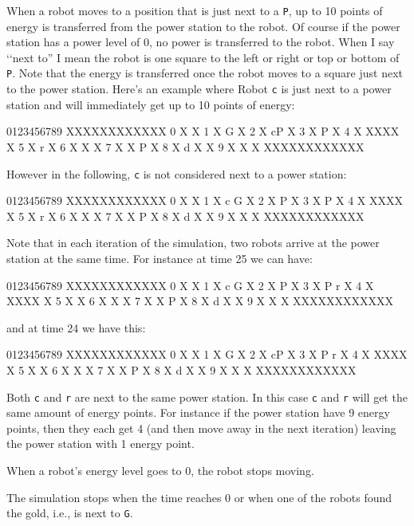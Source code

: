 When a robot moves to a position that is just next to a \verb!P!,
up to 10 points of energy is transferred from the power station to the robot.
Of course if the power station has a power level of 0, 
no power is transferred to the robot.
When I say \lq\lq next to'' I mean the robot is one square to the left
or right or top or bottom of \verb!P!.
Note that the energy is transferred once the robot moves to a square just
next to the power station.
Here's an example where Robot \verb!c! is just next to a power station
and will immediately get up to 10 points of energy:
{\small
\begin{console}
   0123456789
  XXXXXXXXXXXX
0 X          X
1 X       G  X
2 X    cP    X
3 X P        X
4 X   XXXX   X
5 X   r      X
6 X   X      X
7 X   X   P  X
8 X d X      X
9 X   X      X
  XXXXXXXXXXXX
\end{console}
}
However in the following, \verb!c! is not considered next to a power station:
{\small
\begin{console}
   0123456789
  XXXXXXXXXXXX
0 X          X
1 X    c  G  X
2 X     P    X
3 X P        X
4 X   XXXX   X
5 X   r      X
6 X   X      X
7 X   X   P  X
8 X d X      X
9 X   X      X
  XXXXXXXXXXXX
\end{console}
}
Note that in each iteration of the simulation, two robots
arrive at the power station at the same time.
For instance at time 25 we can have:
{\small
\begin{console}
   0123456789
  XXXXXXXXXXXX
0 X          X
1 X    c  G  X
2 X     P    X
3 X P    r   X
4 X   XXXX   X
5 X          X
6 X   X      X
7 X   X   P  X
8 X d X      X
9 X   X      X
  XXXXXXXXXXXX
\end{console}
}
and at time 24 we have this:
{\small
\begin{console}
   0123456789
  XXXXXXXXXXXX
0 X          X
1 X       G  X
2 X    cP    X
3 X P   r    X
4 X   XXXX   X
5 X          X
6 X   X      X
7 X   X   P  X
8 X d X      X
9 X   X      X
  XXXXXXXXXXXX
\end{console}
}
Both \verb!c! and \verb!r! are next to the same power station.
In this case \verb!c! and \verb!r! will get the same amount of energy points.
For instance if the power station have 9 energy points,
then they each get 4 (and then move away in the next iteration)
leaving the power station with 1 energy point.

When a robot's energy level goes to 0, the robot stops moving.

The simulation stops when the time reaches 0 or when one of the robots
found the gold, i.e., is next to \verb!G!.

